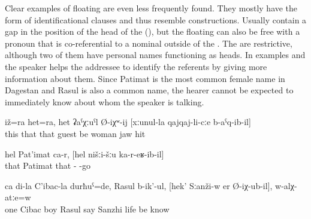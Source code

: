 Clear examples of floating  are even less frequently found. They mostly have the form of identificational  clauses and thus resemble  constructions. Usually  contain a gap in the position of the head of the  (), but the floating  can also be free  with a pronoun that is co-referential to a nominal outside of the . The  are restrictive, although two of them have personal names functioning as heads. In examples  and  the speaker helps the addressee to identify the referents by giving more information about them. Since Patimat is the most common female name in Dagestan and Rasul is also a common name, the hearer cannot be expected to immediately know about whom the speaker is talking.
%
\begin{exe}
	\ex	\label{ex:‎This also and this also is probably the man who hit the woman on the jaw}
	\gll	iž=ra	het=ra,	het	ʡaˁχːuˁl	Ø-iχʷ-ij	[xːunul-la	qajqaj-li-cːe	b-aˁq-ib-il]\\
		this	that	that	guest	be	woman	jaw	hit\\
	\glt	{}

	\ex	\label{ex:‎‎That is the Patimat who had come to us. (She is the daughter}
	\gll	hel	Pat'imat	ca-r,	[hel	nišːi-šːu	ka-r-eʁ-ib-il]\\
		that	Patimat		that	- -go\\
	\glt	{}

	\ex	\label{ex:One was the son of my Cibac, his name is Rasul, the one that lived in Sanzhi, do you know him}
	\gll	ca	di-la	C'ibac-la	durħuˁ=de,	Rasul	b-ik'-ul,	[hek'	Sːanži-w er	Ø-iχ-ub-il],	w-alχ-atːe=w	\\
		one		Cibac	boy	Rasul	say		Sanzhi	life	\tsc{m-}be	know\\
	\glt	{}
\end{exe}

